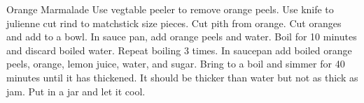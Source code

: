 \documentclass[../cookbook.tex]{subfiles}
\begin{document}
\begin{recipe}{Orange Marmalade}{}{}
    Use vegtable peeler to remove orange peels. Use knife to julienne
    cut rind to matchstick size pieces. Cut pith from orange. Cut
    oranges and add to a bowl.
    In sauce pan, add orange peels and water. Boil for 10 minutes
    and discard boiled water. Repeat boiling 3 times. In saucepan
    add boiled orange peels, orange, lemon juice, water, and sugar.
    Bring to a boil and simmer for 40 minutes until it has thickened.
    It should be thicker than water but not as thick as jam. Put in a
    jar and let it cool.
\end{recipe}
\end{document}
